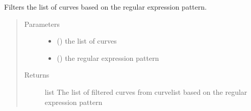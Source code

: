 \documentclass[letterpaper,10pt,english]{sphinxmanual}
\begin{document}
\begin{fulllineitems}
\label{\detokenize{pydv:pydvpy.filtercurves}}
Filters the list of curves based on the regular expression pattern.

\begin{sphinxVerbatim}[commandchars=\\\{\}]
   
\end{sphinxVerbatim}
\begin{quote}\begin{description}
\item[{Parameters}] \leavevmode\begin{itemize}
\item {} 
 ({\hyperref[\detokenize{pydv:curve.Curve}]{}}) \textendash{} the list of curves

\item {} 
 () \textendash{} the regular expression pattern

\end{itemize}

\item[{Returns}] \leavevmode
list \textendash{} The list of filtered curves from curvelist based on the regular expression pattern

\end{description}\end{quote}

\end{fulllineitems}

\end{document}
